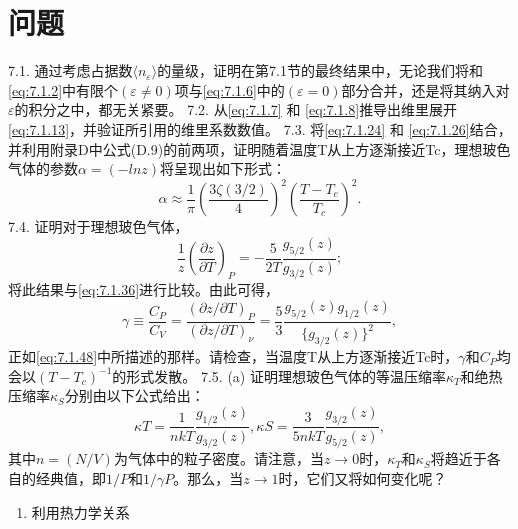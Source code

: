 \section{问题}\label{ux95eeux9898_chap7}
7.1. 通过考虑占据数\(\langle n_{\varepsilon}\rangle\)的量级，证明在第7.1节的最终结果中，无论我们将和\autoref{eq:7.1.2}中有限个\((\varepsilon\neq0)\)项与\autoref{eq:7.1.6}中的\((\varepsilon=0)\)部分合并，还是将其纳入对\(\varepsilon\)的积分之中，都无关紧要。
7.2. 从\autoref{eq:7.1.7} 和 \autoref{eq:7.1.8}推导出维里展开\autoref{eq:7.1.13}，并验证所引用的维里系数数值。
7.3. 将\autoref{eq:7.1.24} 和 \autoref{eq:7.1.26}结合，并利用附录D中公式(D.9)的前两项，证明随着温度T从上方逐渐接近Tc，理想玻色气体的参数\(\alpha=(−lnz)\)将呈现出如下形式：
\begin{equation}\tag{7.5.41}\label{eq:7.5.41}
\alpha \approx \frac { 1 } { \pi } \left( \frac { 3 \zeta ( 3 / 2 ) } { 4 } \right) ^{2} \left( \frac { T - T _ { c } } { T _ { c } } \right) ^{2} .
\end{equation}
7.4. 证明对于理想玻色气体，
\begin{equation}\tag{7.5.42}\label{eq:7.5.42}
\frac { 1 } { z } \left( \frac { \partial z } { \partial T } \right) _ { P } = - \frac { 5 } { 2 T } \frac { g _ { 5 / 2 } ( z ) } { g _ { 3 / 2 } ( z ) } ;
\end{equation}
将此结果与\autoref{eq:7.1.36}进行比较。由此可得，
\begin{equation}\tag{7.5.43}\label{eq:7.5.43}
\gamma \equiv \frac { C _ { P } } { C _ { V } } = \frac { ( \partial z / \partial T ) _ { P } } { ( \partial z / \partial T ) _ { \nu } } = \frac { 5 } { 3 } \frac { g _ { 5 / 2 } ( z ) g _ { 1 / 2 } ( z ) } { \{ g _ { 3 / 2 } ( z ) \} ^{2} } ,
\end{equation}
正如\autoref{eq:7.1.48}中所描述的那样。请检查，当温度T从上方逐渐接近Tc时，\(\gamma\)和\(C_P\)均会以\((T - T_c)^{-1}\)的形式发散。
7.5. (a) 证明理想玻色气体的等温压缩率\(\kappa_{T}\)和绝热压缩率\(\kappa_{S}\)分别由以下公式给出：
\begin{equation}\tag{7.5.44}\label{eq:7.5.44}
\kappa T = \frac { 1 } { n k T } \frac { g _ { 1 / 2 } ( z ) } { g _ { 3 / 2 } ( z ) } ,  \kappa S = \frac { 3 } { 5 n k T } \frac { g _ { 3 / 2 } ( z ) } { g _ { 5 / 2 } ( z ) } ,
\end{equation}
其中\(n=(N/V)\)为气体中的粒子密度。请注意，当\(z\to0\)时，\(\kappa_T\)和\(\kappa_S\)将趋近于各自的经典值，即\(1/P\)和\(1/\gamma P\)。那么，当\(z\to1\)时，它们又将如何变化呢？
\begin{enumerate}
\def\labelenumi{(\alph{enumi})}
\setcounter{enumi}{1}
\item
  利用热力学关系
\end{enumerate}
